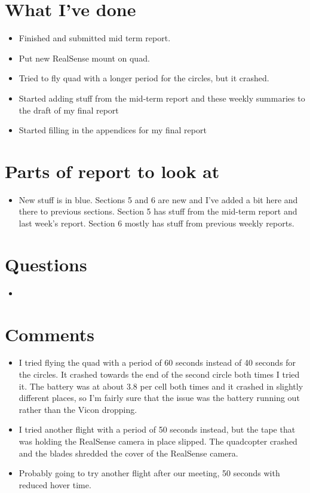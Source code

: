 \documentclass[12pt,a4paper]{article}
\begin{document}
\author{Katrina Ashton}


\pagestyle{fancy}
\fancyhf{}
\rhead{\thepage}

\section{What I've done}
\begin{itemize}
\item{Finished and submitted mid term report.}
\item{Put new RealSense mount on quad.}
\item{Tried to fly quad with a longer period for the circles, but it crashed.}
\item{Started adding stuff from the mid-term report and these weekly summaries to the draft of my final report}
\item{Started filling in the appendices for my final report}
\end{itemize}

\section{Parts of report to look at}
\begin{itemize}
\item{New stuff is in blue. Sections 5 and 6 are new and I've added a bit here and there to previous sections. Section 5 has stuff from the mid-term report and last week's report. Section 6 mostly has stuff from previous weekly reports. }
\end{itemize}

\section{Questions}
\begin{itemize}
\item
\end{itemize}

\section{Comments}
\begin{itemize}
\item I tried flying the quad with a period of 60 seconds instead of 40 seconds for the circles. It crashed towards the end of the second circle both times I tried it. The battery was at about 3.8 per cell both times and it crashed in slightly different places, so I'm fairly sure that the issue was the battery running out rather than the Vicon dropping.
\item I tried another flight with a period of 50 seconds instead, but the tape that was holding the RealSense camera in place slipped. The quadcopter crashed and the blades shredded the cover of the RealSense camera.
\item Probably going to try another flight after our meeting, 50 seconds with reduced hover time.
\end{itemize}
\end{document}
